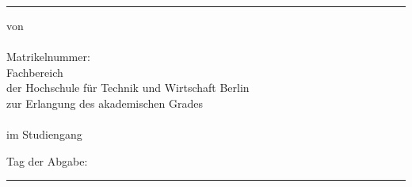 {      \textcolor{HKS66}{\rule{\linewidth}{.4mm}}
      \begin{center}
        \begin{hsheadfont}
          \textcolor{\headcolor}{\LARGE \textbf{\thetitel}}
        \end{hsheadfont}
      \end{center}
      \begin{hsheadfont}
        \begin{center}
          \textbf{\Large{\thethesistyp}}
        \end{center}
      \end{hsheadfont}
      \begin{center}
        \begin{hsfont}
          von\\[2ex]
          {\textbf{\large\theautor}}\\[2ex]
          Matrikelnummer: \thematrikelnr\\[2ex]
          Fachbereich \thefachbereich\\
          der Hochschule für Technik und Wirtschaft Berlin\\[2ex]
          zur Erlangung des akademischen Grades\\
          \textbf{\theabschluss}\\
          im Studiengang\\
          \textbf{\thestudiengang}
        \end{hsfont}
      \end{center}
     
       \begin{center}
         Tag der Abgabe: \thedatum 
       \end{center}
         
      
      \thebetreuerFeld
      

      \textcolor{HKS66}{\rule{\linewidth}{0.4mm}}\\[1.5ex]
       \begin{hsheadfont}
         ~\hfill~
       \end{hsheadfont}
    }

